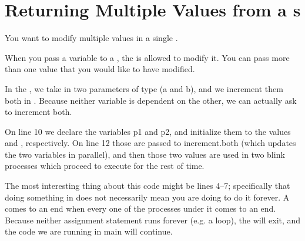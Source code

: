 % 
\section{Returning Multiple Values from a {\PROC}s}
\problem
You want to modify multiple values in a single \PROC.

\solution
When you pass a variable to a \PROC, the \PROC is allowed to modify it. You can pass more than one value that you would like to have modified.



\discussion
In the , we take in two parameters of type \INT ({\code a} and {\code b}), and we increment them both in \PARallel. Because neither variable is dependent on the other, we can actually ask \occam to increment both. 

On line 10 we declare the variables {\code p1} and {\code p2}, and initialize them to the values {} and {}, respectively. On line 12 those are passed to {\code increment.both} (which updates the two variables in parallel), and then those two values are used in two {\code blink} processes which proceed to execute for the rest of time.

The most interesting thing about this code might be lines 4--7; specifically that doing something in \PARallel does not necessarily mean you are doing to do it forever. A \PAR comes to an end when every one of the processes under it comes to an end. Because neither assignment statement runs forever (e.g. a \WHILETRUE loop), the \PAR will exit, and the code we are running in {\code main} will continue.

\makingthingsbreak

\XXX

\seealso

\XXX